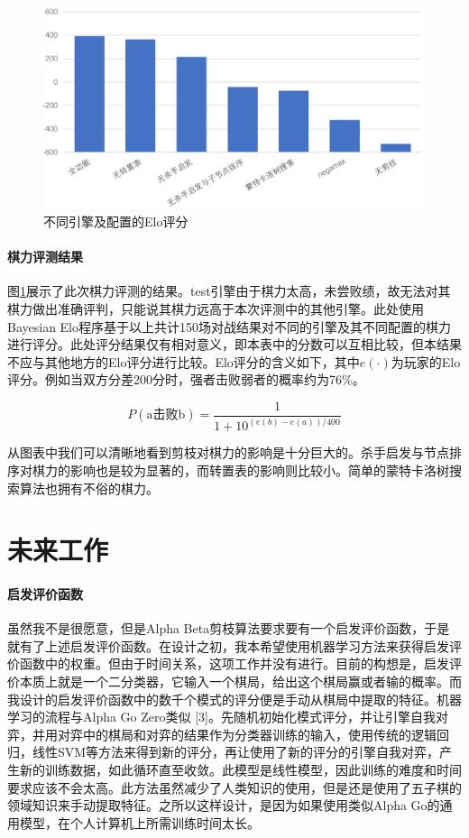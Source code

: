 \documentclass{ctexart}
\begin{document}
\begin{figure}
    \includegraphics[width=\textwidth]{assets/elo.png}
    \caption{不同引擎及配置的Elo评分}
    \label{fig:elo}
\end{figure}

\paragraph{棋力评测结果} 图\ref{fig:elo}展示了此次棋力评测的结果。test引擎由于棋力太高，未尝败绩，故无法对其棋力做出准确评判，只能说其棋力远高于本次评测中的其他引擎。此处使用Bayesian Elo程序\cite{WEBSITE:BayesianELO}基于以上共计150场对战结果对不同的引擎及其不同配置的棋力进行评分。此处评分结果仅有相对意义，即本表中的分数可以互相比较，但本结果不应与其他地方的Elo评分进行比较。Elo评分的含义如下，其中$e(\cdot)$为玩家的Elo评分。例如当双方分差200分时，强者击败弱者的概率约为76\%。

\begin{equation}
    P(\text{a击败b})=\frac{1}{1+10^{(e(b)-e(a))/400}}
\end{equation}

从图表中我们可以清晰地看到剪枝对棋力的影响是十分巨大的。杀手启发与节点排序对棋力的影响也是较为显著的，而转置表的影响则比较小。简单的蒙特卡洛树搜索算法也拥有不俗的棋力。

\section{未来工作}
\paragraph{启发评价函数} 虽然我不是很愿意，但是Alpha Beta剪枝算法要求要有一个启发评价函数，于是就有了上述启发评价函数。在设计之初，我本希望使用机器学习方法来获得启发评价函数中的权重。但由于时间关系，这项工作并没有进行。目前的构想是，启发评价本质上就是一个二分类器，它输入一个棋局，给出这个棋局赢或者输的概率。而我设计的启发评价函数中的数千个模式的评分便是手动从棋局中提取的特征。机器学习的流程与Alpha Go Zero类似 [3]。先随机初始化模式评分，并让引擎自我对弈，并用对弈中的棋局和对弈的结果作为分类器训练的输入，使用传统的逻辑回归，线性SVM等方法来得到新的评分，再让使用了新的评分的引擎自我对弈，产生新的训练数据，如此循环直至收敛。此模型是线性模型，因此训练的难度和时间要求应该不会太高。此方法虽然减少了人类知识的使用，但是还是使用了五子棋的领域知识来手动提取特征。之所以这样设计，是因为如果使用类似Alpha Go的通用模型，在个人计算机上所需训练时间太长。
\end{document}
